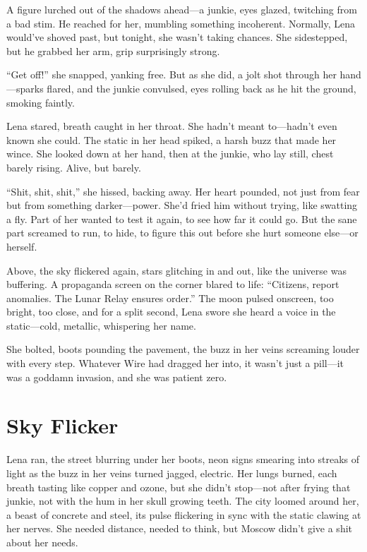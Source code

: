 \documentclass[12pt]{book}
\begin{document}
A figure lurched out of the shadows ahead---a junkie, eyes glazed, twitching from a bad stim. He reached for her, mumbling something incoherent. Normally, Lena would’ve shoved past, but tonight, she wasn’t taking chances. She sidestepped, but he grabbed her arm, grip surprisingly strong.

``Get off!'' she snapped, yanking free. But as she did, a jolt shot through her hand---sparks flared, and the junkie convulsed, eyes rolling back as he hit the ground, smoking faintly.

Lena stared, breath caught in her throat. She hadn’t meant to---hadn’t even known she could. The static in her head spiked, a harsh buzz that made her wince. She looked down at her hand, then at the junkie, who lay still, chest barely rising. Alive, but barely.

``Shit, shit, shit,'' she hissed, backing away. Her heart pounded, not just from fear but from something darker---power. She’d fried him without trying, like swatting a fly. Part of her wanted to test it again, to see how far it could go. But the sane part screamed to run, to hide, to figure this out before she hurt someone else---or herself.

Above, the sky flickered again, stars glitching in and out, like the universe was buffering. A propaganda screen on the corner blared to life: ``Citizens, report anomalies. The Lunar Relay ensures order.'' The moon pulsed onscreen, too bright, too close, and for a split second, Lena swore she heard a voice in the static---cold, metallic, whispering her name.

She bolted, boots pounding the pavement, the buzz in her veins screaming louder with every step. Whatever Wire had dragged her into, it wasn’t just a pill---it was a goddamn invasion, and she was patient zero.

\section{Sky Flicker}

Lena ran, the street blurring under her boots, neon signs smearing into streaks of light as the buzz in her veins turned jagged, electric. Her lungs burned, each breath tasting like copper and ozone, but she didn’t stop---not after frying that junkie, not with the hum in her skull growing teeth. The city loomed around her, a beast of concrete and steel, its pulse flickering in sync with the static clawing at her nerves. She needed distance, needed to think, but Moscow didn’t give a shit about her needs.
\end{document}
